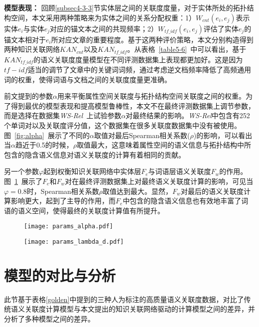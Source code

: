 \textbf{模型表现：}
回顾\ref{subsec4-3-3}节实体层之间的关联度度量，对于实体所处的拓扑结构空间，本文采用两种策略来为实体之间的关系分配权重：1）$W_{cnt}(e_i,e_j)$表示实体$e_i$与实体$e_j$对应的锚文本之间的共现频率；2）$W_{tf\_idf}(e_i,e_j)$评估了实体$e_j$的锚文本相对于$e_i$所对应文章的重要程度。基于这两种评价策略，本文分别构造得到两种知识关联网络$KAN_{cnt}$以及$KAN_{tf\_idf}$。从表格~\ref{table5-6}~中可以看出，基于$KAN_{tf\_idf}$的语义关联度度量模型在不同评测数据集上表现都更加好。这是因为$tf-idf$适当的调节了文章中的关键词词频，通过考虑逆文档频率降低了高频通用词的权重，使得词语与文档之间的关联度度量更准确。

前文提到的参数$\alpha$用来平衡属性空间关联度与拓扑结构空间关联度之间的权重。为了得到最优的模型表现和提高模型鲁棒性，本文不在最终评测数据集上调节参数，而是选择在数据集\emph{WS-Rel}~\cite{ws/AgirreAHKPS09}上试验参数$\alpha$对最终结果的影响。\emph{WS-Rel}中包含有252个单词对以及关联度评分值，这个数据集在很多关联度数据集中没有被使用。图~\ref{fig:alpha}~展示了不同的$\alpha$取值对最后Spearman相关系数($\rho$)的影响，可以看出当$\alpha$趋近于0.5的时候，$\rho$取值最大，这意味着属性空间的语义信息与拓扑结构中所包含的隐含语义信息对语义关联度的计算有着相同的贡献。

另一个参数$\varphi$起到权衡知识关联网络中实体层$F_e$与词语层语义关联度$F_w$的作用。图~\ref{fig:lambda}~展示了$F_e$和$F_w$对在最终评测数据集上对最终语义关联度计算的影响，可见当$\varphi=0.8$时，Spearman相关系数$\rho$取值达到最大。显然，$F_w$对最后的语义关联度计算影响更大，起到了主导的作用，而$F_e$中包含的隐含语义信息也有效地丰富了词语的语义空间，使得最终的关联度计算值有所提升。

\begin{figure}[htbp]
    \begin{minipage}{0.48\textwidth}
      \centering
      \texttt{[image: params\_alpha.pdf]}
      \label{fig:alpha}
    \end{minipage}\hfill
    \begin{minipage}{0.48\textwidth}
      \centering
      \texttt{[image: params\_lambda\_d.pdf]}
      \label{fig:lambda}
    \end{minipage}
\end{figure}


\section{模型的对比与分析}
此节基于表格\ref{golden}中提到的三种人为标注的高质量语义关联度数据，对比了传统语义关联度计算模型与本文提出的知识关联网络驱动的计算模型之间的差异，并分析了多种模型之间的差异。

